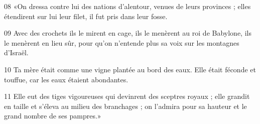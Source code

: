 
08 «On dressa contre lui des nations d’alentour, venues de leurs provinces ; elles étendirent sur lui leur filet, il fut pris dans leur fosse.

09 Avec des crochets ils le mirent en cage, ils le menèrent au roi de Babylone, ils le menèrent en lieu sûr, pour qu’on n’entende plus sa voix sur les montagnes d’Israël.

10 Ta mère était comme une vigne plantée au bord des eaux. Elle était féconde et touffue, car les eaux étaient abondantes.

11 Elle eut des tiges vigoureuses qui devinrent des sceptres royaux ; elle grandit en taille et s’éleva au milieu des branchages ; on l’admira pour sa hauteur et le grand nombre de ses pampres.»
